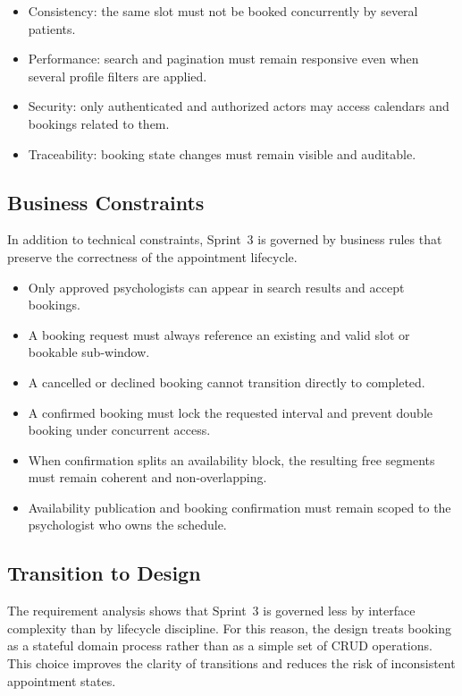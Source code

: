 \documentclass[a4paper,12pt]{report}
\begin{document}
\begin{itemize}[leftmargin=*]
  \item[--] Consistency: the same slot must not be booked concurrently by several patients.
  \item[--] Performance: search and pagination must remain responsive even when several profile filters are applied.
  \item[--] Security: only authenticated and authorized actors may access calendars and bookings related to them.
  \item[--] Traceability: booking state changes must remain visible and auditable.
\end{itemize}

\subsection{Business Constraints}

In addition to technical constraints, Sprint~3 is governed by business rules that preserve the correctness of the appointment lifecycle.

\begin{itemize}[leftmargin=*]
  \item[--] Only approved psychologists can appear in search results and accept bookings.
  \item[--] A booking request must always reference an existing and valid slot or bookable sub-window.
  \item[--] A cancelled or declined booking cannot transition directly to completed.
  \item[--] A confirmed booking must lock the requested interval and prevent double booking under concurrent access.
  \item[--] When confirmation splits an availability block, the resulting free segments must remain coherent and non-overlapping.
  \item[--] Availability publication and booking confirmation must remain scoped to the psychologist who owns the schedule.
\end{itemize}

\subsection{Transition to Design}

The requirement analysis shows that Sprint~3 is governed less by interface complexity than by lifecycle discipline. For this reason, the design treats booking as a stateful domain process rather than as a simple set of CRUD operations. This choice improves the clarity of transitions and reduces the risk of inconsistent appointment states.
\end{document}
